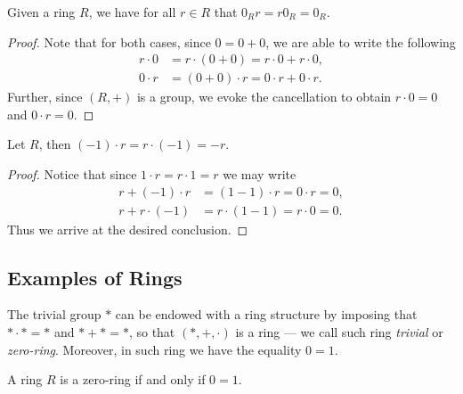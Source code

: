 %
\begin{corollary}
    \label{cor:zero-element-ring}
    Given a ring \(R\), we have for all \(r \in R\) that \(0_R r = r 0_R = 0_R\).
\end{corollary}
%

%
\begin{proof}
    Note that for both cases, since \(0 = 0 + 0\), we are able to write the
    following
    \begin{align*}
        r \cdot 0 & = r \cdot (0 + 0) = r \cdot 0 + r \cdot 0, \\
        0 \cdot r & = (0 + 0) \cdot r = 0 \cdot r + 0 \cdot r.
    \end{align*}
    Further, since \((R, +)\) is a group, we evoke the cancellation to obtain
    \(r \cdot 0 = 0\) and \(0 \cdot r = 0\).
\end{proof}
%

%
\begin{corollary}
    \label{cor:ring-additive-inverse}
    Let \(R\), then \((-1) \cdot r = r \cdot (-1) = -r\).
\end{corollary}
%

%
\begin{proof}
    Notice that since \(1 \cdot r = r \cdot 1 = r\) we may write
    \begin{align*}
        r + (-1) \cdot r & = (1 - 1) \cdot r = 0 \cdot r = 0, \\
        r + r \cdot (-1) & = r \cdot (1 - 1) = r \cdot 0 = 0.
    \end{align*}
    Thus we arrive at the desired conclusion.
\end{proof}
%

\subsection{Examples of Rings}

%
\begin{example}
    \label{exp:trivial-ring}
    The trivial group \(*\) can be endowed with a ring structure by imposing that
    \(* \cdot * = *\) and \(* + * = *\), so that \((*, +, \cdot)\) is a ring --- we
    call such ring \emph{trivial} or \emph{zero-ring}. Moreover, in such ring we
    have the equality \(0 = 1\).
\end{example}
%

%
\begin{corollary}
    \label{cor:zero-ring-condition}
    A ring \(R\) is a zero-ring if and only if \(0 = 1\).
\end{corollary}
%

